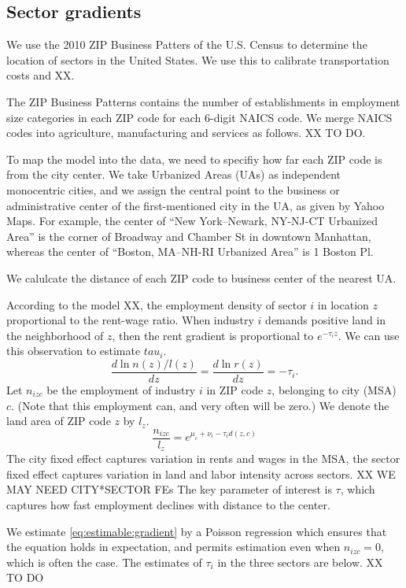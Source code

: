 \documentclass[12pt]{article}
\begin{document}
\subsection{Sector gradients}
We use the 2010 ZIP Business Patters of the U.S. Census to determine the location of sectors in the United States. We use this to calibrate transportation costs and XX.

The ZIP Business Patterns contains the number of establishments in employment size categories in each ZIP code for each 6-digit NAICS code. We merge NAICS codes into agriculture, manufacturing and services as follows. XX TO DO.

To map the model into the data, we need to specifiy how far each ZIP code is from the city center. We take Urbanized Areas (UAs) as independent monocentric cities, and we assign the central point to the business or administrative center of the first-mentioned city in the UA, as given by Yahoo Maps. For example, the center of ``New York–Newark, NY-NJ-CT Urbanized Area'' is the corner of Broadway and Chamber St in downtown Manhattan, whereas the center of ``Boston, MA–NH-RI Urbanized Area'' is 1 Boston Pl.

We calulcate the distance of each ZIP code to business center of the nearest UA.

According to the model XX, the employment density of sector $i$ in location $z$ proportional to the rent-wage ratio. When industry $i$ demands positive land in the neighborhood of $z$, then the rent gradient is proportional to $e^{-\tau_iz}$. We can use this observation to estimate $tau_i$.
\[
\frac{d\ln n(z)/l(z)}{dz} =\frac{d\ln r(z)}{dz} = -\tau_i.
\]
Let $n_{izc}$ be the employment of industry $i$ in ZIP code $z$, belonging to city (MSA) $c$. (Note that this employment can, and very often will be zero.) We denote the land area of ZIP code $z$ by $l_z$.
\begin{equation}\label{eq:estimable:gradient}
\frac{n_{izc}}{l_z} = e^{\mu_c+\nu_i-\tau_i d(z,c)}
\end{equation}
The city fixed effect captures variation in rents and wages in the MSA, the sector fixed effect captures variation in land and labor intensity across sectors. XX WE MAY NEED CITY*SECTOR FEs The key parameter of interest is $\tau$, which captures how fast employment declines with distance to the center.

We estimate \eqref{eq:estimable:gradient} by a Poisson regression which ensures that the equation holds in expectation, and permits estimation even when $n_{izc}=0$, which is often the case. The estimates of $\tau_i$ in the three sectors are below. XX TO DO
\end{document}
